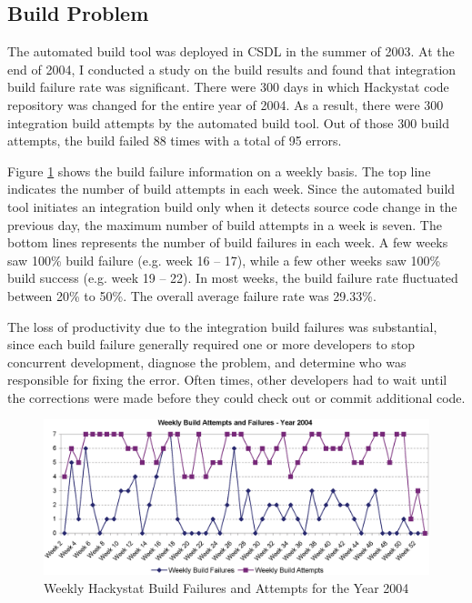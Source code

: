 \newpage


\subsection{Build Problem}

The automated build tool was deployed in CSDL in the summer of 2003. At the end of 2004, I conducted a study on the build results and found that integration build failure rate was significant. There were 300 days in which Hackystat code repository was changed for the entire year of 2004. As a result, there were 300 integration build attempts by the automated build tool. Out of those 300 build attempts, the build failed 88 times with a total of 95 errors. 

Figure \ref{fig:WeeklyBuildFailuresAndAttempts2004} shows the build failure information on a weekly basis. The top line indicates the number of build attempts in each week. Since the automated build tool initiates an integration build only when it detects source code change in the previous day, the maximum number of build attempts in a week is seven. The bottom lines represents the number of build failures in each week. A few weeks saw 100\% build failure (e.g. week 16 -- 17), while a few other weeks saw 100\% build success (e.g. week 19 -- 22). In most weeks, the build failure rate fluctuated between 20\% to 50\%. The overall average failure rate was 29.33\%. 

The loss of productivity due to the integration build failures was substantial, since each build failure generally required one or more developers to stop concurrent development, diagnose the problem, and determine who was responsible for fixing the error. Often times, other developers had to wait until the corrections were made before they could check out or commit additional code.


\begin{figure}[tbp]
  \centering
  \includegraphics[width=1.00\textwidth]{figures/WeeklyBuildFailuresAndAttempts2004}
  \caption{Weekly Hackystat Build Failures and Attempts for the Year 2004}
  \label{fig:WeeklyBuildFailuresAndAttempts2004}
\end{figure}

